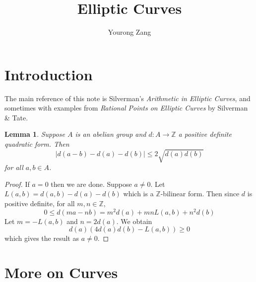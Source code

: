 \documentclass[12pt]{article}
\title{Elliptic Curves}
\author{Yourong Zang}
\newtheorem{lemma}{Lemma}[subsection]
\theoremstyle{remark}
\theoremstyle{definition}
\newcommand{\Z}[0]{\mathbb{Z}}
\begin{document}
    \maketitle
    \tableofcontents
    \newpage
    \section{Introduction}\label{sec-intro}
        The main reference of this note is Silverman's \textit{Arithmetic in Elliptic Curves}, and sometimes with examples from \textit{Rational Points on Elliptic Curves} by Silverman \& Tate.

        \begin{lemma}\label{lemma-cauchy-schwartz}
            Suppose $A$ is an abelian group and $d:A\to\Z$ a positive definite quadratic form. Then
            \[|d(a-b)-d(a)-d(b)|\leqslant2\sqrt{d(a)d(b)}\]
            for all $a, b\in A$.
        \end{lemma}
        \begin{proof}
            If $a=0$ then we are done. Suppose $a\neq 0$. Let $L(a, b)=d(a, b)-d(a)-d(b)$ which is a $\Z$-bilinear form. Then since $d$ is positive definite, for all $m,n\in\Z$,
            \[0\leqslant d(ma-nb)=m^2d(a)+mnL(a,b)+n^2d(b)\]
            Let $m=-L(a,b)$ and $n=2d(a)$. We obtain
            \[d(a)\left(4d(a)d(b)-L(a, b)\right)\geqslant 0\]
            which gives the result as $a\neq 0$.
        \end{proof}
        \section{More on Curves}
\end{document}
